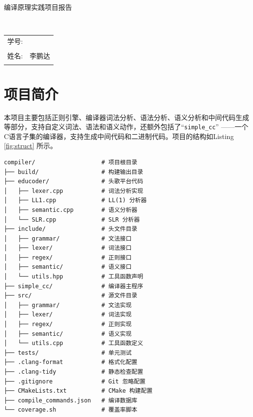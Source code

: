 \documentclass[a4paper]{article}
\begin{document}
\begin{center}
    {{ \heiti 编译原理实践项目报告}}
\end{center}
~\\[-3em]
\begin{center}
    \begin{tabular}{>{\raggedleft}m{3em} >{\centering\arraybackslash}m{7em}}
    学号: & 10225101460 \\[-3ex] %
     & \hrulefill \\[-1ex]
    姓名: & 李鹏达 \\[-3ex]
    & \hrulefill \\
    \end{tabular}
\end{center}

\section{项目简介}

本项目主要包括正则引擎、编译器词法分析、语法分析、语义分析和中间代码生成等部分，支持自定义词法、语法和语义动作，还额外包括了``\texttt{simple\_cc}'' ——一个C语言子集的编译器，支持生成中间代码和二进制代码。项目的结构如Listing \ref{fig:struct} 所示。

\begin{lstlisting}[numbers=none,caption={项目结构},label={fig:struct}]
compiler/                   # 项目根目录
├── build/                  # 构建输出目录
├── educoder/               # 头歌平台代码
│   ├── lexer.cpp           # 词法分析实现
│   ├── LL1.cpp             # LL(1) 分析器
│   ├── semantic.cpp        # 语义分析器
│   └── SLR.cpp             # SLR 分析器
├── include/                # 头文件目录
│   ├── grammar/            # 文法接口
│   ├── lexer/              # 词法接口
│   ├── regex/              # 正则接口
│   ├── semantic/           # 语义接口
│   └── utils.hpp           # 工具函数声明
├── simple_cc/              # 编译器主程序
├── src/                    # 源文件目录
│   ├── grammar/            # 文法实现
│   ├── lexer/              # 词法实现
│   ├── regex/              # 正则实现
│   ├── semantic/           # 语义实现
│   └── utils.cpp           # 工具函数定义
├── tests/                  # 单元测试
├── .clang-format           # 格式化配置
├── .clang-tidy             # 静态检查配置
├── .gitignore              # Git 忽略配置
├── CMakeLists.txt          # CMake 构建配置
├── compile_commands.json   # 编译数据库
└── coverage.sh             # 覆盖率脚本
\end{lstlisting}
\end{document}
